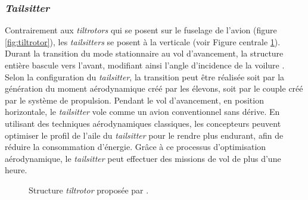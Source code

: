         \subsubsection*{\textit{Tailsitter}}
        Contrairement aux \textit{tiltrotors} qui se posent sur le fuselage de l'avion (figure \ref{fig:tiltrotor}), les \textit{tailsitters} se posent à la verticale (voir Figure centrale \ref{fig:tailsitter}). Durant la transition du mode stationnaire au vol d'avancement, la structure entière bascule vers l'avant, modifiant ainsi l'angle d'incidence de la voilure \cite{RobinRaffaello2017, VerlingWeibelSiegwart2016,smeurINDITail, ChiappinelliNahon2018, tal2022global}. Selon la configuration du \textit{tailsitter}, la transition peut être réalisée soit par la génération du moment aérodynamique créé par les élevons, soit par le couple créé par le système de propulsion. Pendant le vol d'avancement, en position horizontale, le \textit{tailsitter} vole comme un avion conventionnel sans dérive. En utilisant des techniques aérodynamiques classiques, les concepteurs peuvent optimiser le profil de l'aile du \textit{tailsitter} pour le rendre plus endurant, afin de réduire la consommation d'énergie. Grâce à ce processus d'optimisation aérodynamique, le \textit{tailsitter} peut effectuer des missions de vol de plus d'une heure.

        \begin{figure}[ht!]
            \centering
            \caption{Structure \textit{tiltrotor}  proposée par \cite{smeurINDITail,fernandez:hal-04612206,pflimlin:tel-00132352}.}
            \label{fig:tailsitter}
        \end{figure}
        
